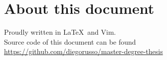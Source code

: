 \chapter*{About this document}
Proudly written in \LaTeX\ and Vim.\\

Source code of this document can be found \url{https://github.com/diegorusso/master-degree-thesis}\\
